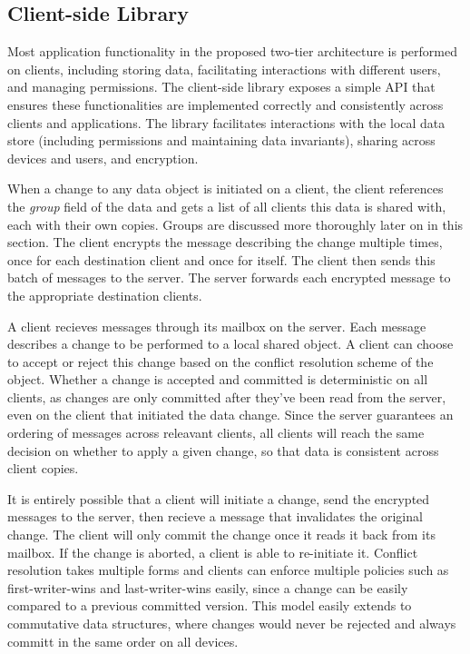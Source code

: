 
\subsection{Client-side Library}



Most application functionality in the proposed two-tier architecture is performed on clients, including storing data, facilitating interactions with different users, and managing permissions. The \name{} client-side library exposes a simple API that ensures these functionalities are implemented correctly and consistently across clients and applications. The library facilitates interactions with the local data store (including permissions and maintaining data invariants), sharing across devices and users, and encryption.  


When a change to any data object is initiated on a client, the client references the \textit{group} field of the data and gets a list of all clients this data is shared with, each with their own copies. Groups are discussed more thoroughly later on in this section. The client encrypts the message describing the change multiple times, once for each destination client and once for itself. The client then sends this batch of messages to the server. The server forwards each encrypted message to the appropriate destination clients. 

A client recieves messages through its mailbox on the server. Each message describes a change to be performed to a local shared object. A client can choose to accept or reject this change based on the conflict resolution scheme of the object. Whether a change is accepted and committed is deterministic on all clients, as changes are only committed after they've been read from the server, even on the client that initiated the data change. Since the server guarantees an ordering of messages across releavant clients, all clients will reach the same decision on whether to apply a given change, so that data is consistent across client copies. 

It is entirely possible that a client will initiate a change, send the encrypted messages to the server, then recieve a message that invalidates the original change. The client will only commit the change once it reads it back from its mailbox. If the change is aborted, a client is able to re-initiate it. Conflict resolution takes multiple forms and \name{} clients can enforce multiple policies such as first-writer-wins and last-writer-wins easily, since a change can be easily compared to a previous committed version. This model easily extends to commutative data structures, where changes would never be rejected and always committ in the same order on all devices.

